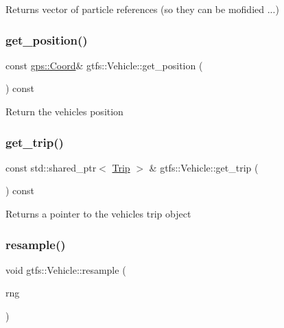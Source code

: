 \begin{DoxyReturn}{Returns}
vector of particle references (so they can be mofidied ...) 
\end{DoxyReturn}
\mbox{\label{classgtfs_1_1Vehicle_a108b44eeddcd90ebae8f6391f157c503}} 
\subsubsection{\texorpdfstring{get\+\_\+position()}{get\_position()}}
{\footnotesize\ttfamily const \hyperlink{classgps_1_1Coord}{gps\+::\+Coord}\& gtfs\+::\+Vehicle\+::get\+\_\+position (\begin{DoxyParamCaption}{ }\end{DoxyParamCaption}) const\hspace{0.3cm}{\ttfamily [inline]}}

Return the vehicle\textquotesingle{}s position \mbox{\label{classgtfs_1_1Vehicle_a616c83927f0d2d513d33277a9ebd3537}} 
\subsubsection{\texorpdfstring{get\+\_\+trip()}{get\_trip()}}
{\footnotesize\ttfamily const std\+::shared\+\_\+ptr$<$ \hyperlink{classgtfs_1_1Trip}{Trip} $>$ \& gtfs\+::\+Vehicle\+::get\+\_\+trip (\begin{DoxyParamCaption}{ }\end{DoxyParamCaption}) const}

\begin{DoxyReturn}{Returns}
a pointer to the vehicle\textquotesingle{}s trip object 
\end{DoxyReturn}
\mbox{\label{classgtfs_1_1Vehicle_a8367fc70a64b7e596422f880dbff1193}} 
\subsubsection{\texorpdfstring{resample()}{resample()}}
{\footnotesize\ttfamily void gtfs\+::\+Vehicle\+::resample (\begin{DoxyParamCaption}\item[{\hyperlink{classsampling_1_1RNG}{sampling\+::\+R\+NG} \&}]{rng }\end{DoxyParamCaption})}

